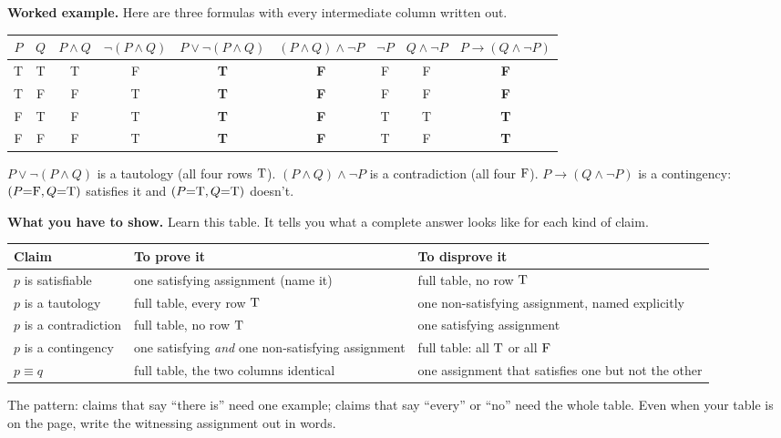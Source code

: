 \textbf{Worked example.} Here are three formulas with every intermediate column written out.

\begin{center}
\begin{tabular}{cc|cc>{\bfseries}c|>{\bfseries}c|cc>{\bfseries}c}
\toprule
$P$ & $Q$ & $P\land Q$ & $\lnot(P\land Q)$ & $P\lor\lnot(P\land Q)$ & $(P\land Q)\land\lnot P$ & $\lnot P$ & $Q\land\lnot P$ & $P\to(Q\land\lnot P)$\\
\midrule
T & T & T & F & T & F & F & F & F\\
T & F & F & T & T & F & F & F & F\\
F & T & F & T & T & F & T & T & T\\
F & F & F & T & T & F & T & F & T\\
\bottomrule
\end{tabular}
\end{center}

$P\lor\lnot(P\land Q)$ is a tautology (all four rows $\mathrm{T}$). $(P\land Q)\land\lnot P$ is a contradiction (all four $\mathrm{F}$). $P\to(Q\land\lnot P)$ is a contingency: $(P{=}\mathrm{F},Q{=}\mathrm{T})$ satisfies it and $(P{=}\mathrm{T},Q{=}\mathrm{T})$ doesn't.

\textbf{What you have to show.} Learn this table. It tells you what a complete answer looks like for each kind of claim.

\begin{center}
\begin{tabularx}{\linewidth}{@{}lLL@{}}
\toprule
\textbf{Claim} & \textbf{To prove it} & \textbf{To disprove it}\\
\midrule
$p$ is satisfiable & one satisfying assignment (name it) & full table, no row $\mathrm{T}$\\
$p$ is a tautology & full table, every row $\mathrm{T}$ & one non-satisfying assignment, named explicitly\\
$p$ is a contradiction & full table, no row $\mathrm{T}$ & one satisfying assignment\\
$p$ is a contingency & one satisfying \emph{and} one non-satisfying assignment & full table: all $\mathrm{T}$ or all $\mathrm{F}$\\
$p\equiv q$ & full table, the two columns identical & one assignment that satisfies one but not the other\\
\bottomrule
\end{tabularx}
\end{center}

The pattern: claims that say ``there is'' need one example; claims that say ``every'' or ``no'' need the whole table. Even when your table is on the page, write the witnessing assignment out in words.

